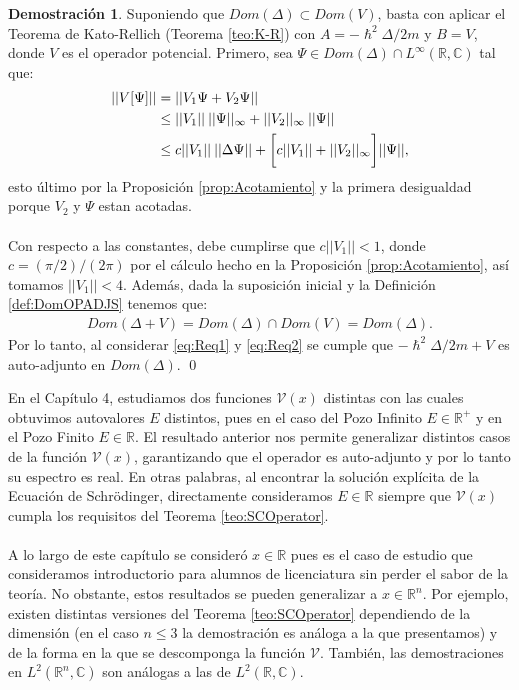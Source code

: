 \documentclass[12pt]{article}
\theoremstyle{definition}
\newtheorem*{demo}{Demostración}
\newcommand*{\field}[1]{\mathbb{#1}}
\begin{document}
\begin{demo}
    Suponiendo que $Dom(\Delta)\subset Dom(V)$, basta con aplicar el Teorema de Kato-Rellich (Teorema \ref{teo:K-R}) con $A = -\hslash^2 \Delta/2m$ y $B = V$, donde $V$ es el operador potencial. Primero, sea $\Psi\in Dom(\Delta)\cap L^{\infty}(\field{R},\field{C})$ tal que:
    \begin{align}
        ||V[\Psi]|| & = ||V_{1}\Psi + V_{2}\Psi||
        \notag
        \\
        &
        \leq ||V_{1}||\:||\Psi||_{\infty} + ||V_{2}||_{\infty}\:||\Psi||
        \notag
        \\
        & \leq
        c||V_{1}||\:||\Delta\Psi|| + \bigg[c||V_{1}|| + ||V_{2}||_{\infty}\bigg]||\Psi||,
        \label{eq:Req1}
    \end{align}
    esto último por la Proposición \ref{prop:Acotamiento} y la primera desigualdad porque $V_{2}$ y $\Psi$ estan acotadas.
    \\ \\
    Con respecto a las constantes, debe cumplirse que $c||V_{1}|| < 1$, donde $c = (\pi/2)/(2\pi)$ por el cálculo hecho en la Proposición \ref{prop:Acotamiento}, así tomamos $||V_{1}||< 4$. Además, dada la suposición inicial y la Definición \ref{def:DomOPADJS} tenemos que:
    \begin{align} Dom(\Delta + V) = Dom(\Delta)\cap Dom(V) = Dom(\Delta).
    \label{eq:Req2}
    \end{align}
     Por lo tanto, al considerar \eqref{eq:Req1} y \eqref{eq:Req2} se cumple que $-\hslash^2\Delta/2m + V$ es auto-adjunto en $Dom(\Delta)$.
    \qed
\end{demo}
\noindent
En el Capítulo 4, estudiamos dos funciones $\mathcal{V}(x)$ distintas con las cuales obtuvimos autovalores $E$ distintos, pues en el caso del Pozo Infinito $E\in\field{R}^+$ y en el Pozo Finito $E\in\field{R}$. El resultado anterior nos permite generalizar distintos casos de la función $\mathcal{V}(x)$, garantizando que el operador es auto-adjunto y por lo tanto su espectro es real. En otras palabras, al encontrar la solución explícita de la Ecuación de Schrödinger, directamente consideramos $E\in\field{R}$ siempre que $\mathcal{V}(x)$ cumpla los requisitos del Teorema \ref{teo:SCOperator}.
\\ \\
A lo largo de este capítulo se consideró $x\in \field{R}$ pues es el caso de estudio que consideramos introductorio para alumnos de licenciatura sin perder el sabor de la teoría. No obstante, estos resultados se pueden generalizar a $x\in \field{R}^n$. Por ejemplo, existen distintas versiones del Teorema \ref{teo:SCOperator} dependiendo de la dimensión (en el caso $n\leq 3$ la demostración es análoga a la que presentamos) y de la forma en la que se descomponga la función $\mathcal{V}$. También, las demostraciones en $L^2(\field{R}^n,\field{C})$ son análogas a las de $L^2(\field{R},\field{C})$.
\newpage
\end{document}
